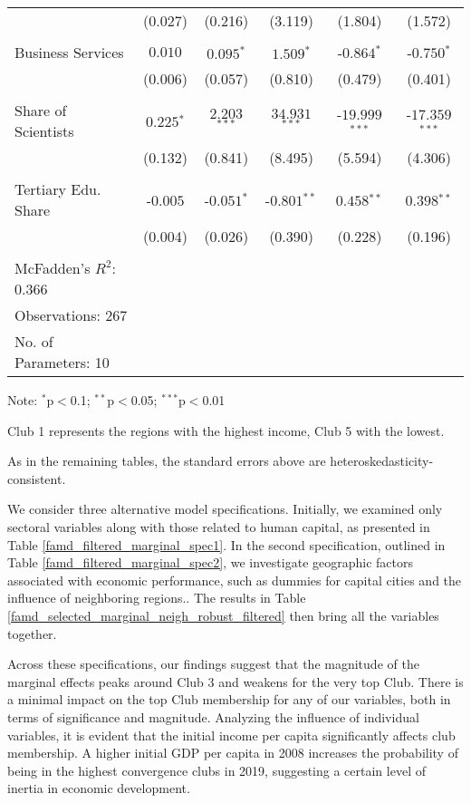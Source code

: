 \documentclass[11pt]{article}
\begin{document}
\begin{table}[!htbp]
{\begin{minipage}{\textwidth}
\begin{tabular}{@{\extracolsep{5pt}} lccccc}
& (0.027) &  (0.216) & (3.119) & (1.804) & (1.572)\\
&\\
Business Services & $0.010$ & $0.095$$^{*}$  & $1.509$$^{*}$  & $ $-$0.864$$^{*}$  & $ $-$0.750$$^{*}$  \\
& (0.006) &  (0.057) & (0.810) & (0.479) & (0.401)\\
&\\
Share of Scientists & $0.225$$^{*}$  & $2.203$$^{***}$  & $34.931$$^{***}$  & $ $-$19.999$$^{***}$  & $ $-$17.359$$^{***}$  \\ 
& (0.132) &  (0.841) & (8.495) & (5.594) & (4.306)\\
&\\
Tertiary Edu. Share & $ $-$0.005$ & $ $-$0.051$$^{*}$  & $ $-$0.801$$^{**}$  & $0.458$$^{**}$  & $0.398$$^{**}$  \\
& (0.004) &  (0.026) & (0.390) & (0.228) & (0.196)\\
\hline \hline \\[-1.8ex]
McFadden's $R^{2}$: 0.366 \\
Observations: 267\\
No. of Parameters: 10\\
\hline
\end{tabular}
\begin{tablenotes}
\small 
\item Note: $^{*}$p$<$0.1; $^{**}$p$<$0.05; $^{***}$p$<$0.01
\item Club 1 represents the regions with the highest income, Club 5 with the lowest.
\item As in the remaining tables, the standard errors above are heteroskedasticity-consistent.
\end{tablenotes}
\end{minipage}}
\end{table} 

We consider three alternative model specifications. Initially, we examined only sectoral variables along with those related to human capital, as presented in Table \ref{famd_filtered_marginal_spec1}. In the second specification, outlined in Table \ref{famd_filtered_marginal_spec2}, we investigate geographic factors associated with economic performance, such as dummies for capital cities and the influence of neighboring regions.. The results in Table \ref{famd_selected_marginal_neigh_robust_filtered} then bring all the variables together. 

Across these specifications, our findings suggest that the magnitude of the marginal effects peaks around Club 3 and weakens for the very top Club. There is a minimal impact on the top Club membership for any of our variables, both in terms of significance and magnitude. 
Analyzing the influence of individual variables, it is evident that the initial income per capita significantly affects club membership. A higher initial GDP per capita in 2008 increases the probability of being in the highest convergence clubs in 2019, suggesting a certain level of inertia in economic development.
\end{document}
